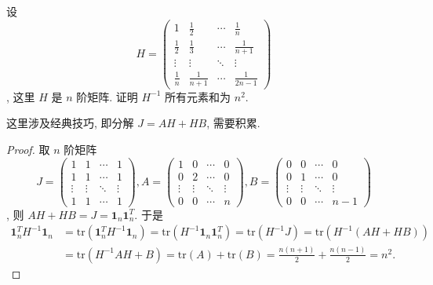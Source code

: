 \documentclass[../../main.tex]{subfiles}
\begin{document}
\begin{lemma}[Hilbert矩阵逆矩阵元素和]\label{lemma:Hilbert矩阵逆矩阵元素和}
设
\[
H = 
\begin{pmatrix}
1 & \frac{1}{2} & \cdots & \frac{1}{n} \\
\frac{1}{2} & \frac{1}{3} & \cdots & \frac{1}{n + 1} \\
\vdots & \vdots & \ddots & \vdots \\
\frac{1}{n} & \frac{1}{n + 1} & \cdots & \frac{1}{2n - 1}
\end{pmatrix}
\]
, 这里 $H$ 是 $n$ 阶矩阵. 证明 $H^{-1}$ 所有元素和为 $n^{2}$.
\end{lemma}
\begin{note}
这里涉及经典技巧, 即分解 $J = AH + HB$, 需要积累.
\end{note}
\begin{proof}
取 $n$ 阶矩阵
\[
J = 
\begin{pmatrix}
1 & 1 & \cdots & 1 \\
1 & 1 & \cdots & 1 \\
\vdots & \vdots & \ddots & \vdots \\
1 & 1 & \cdots & 1
\end{pmatrix}
,
A = 
\begin{pmatrix}
1 & 0 & \cdots & 0 \\
0 & 2 & \cdots & 0 \\
\vdots & \vdots & \ddots & \vdots \\
0 & 0 & \cdots & n
\end{pmatrix}
,
B = 
\begin{pmatrix}
0 & 0 & \cdots & 0 \\
0 & 1 & \cdots & 0 \\
\vdots & \vdots & \ddots & \vdots \\
0 & 0 & \cdots & n - 1
\end{pmatrix}
\]
,
则 $AH + HB = J = \mathbf{1}_{n}\mathbf{1}_{n}^{T}$. 于是
\begin{align*}
\mathbf{1}_{n}^{T}H^{-1}\mathbf{1}_{n} &= \mathrm{tr}\left(\mathbf{1}_{n}^{T}H^{-1}\mathbf{1}_{n}\right) = \mathrm{tr}\left(H^{-1}\mathbf{1}_{n}\mathbf{1}_{n}^{T}\right) = \mathrm{tr}\left(H^{-1}J\right) = \mathrm{tr}\left(H^{-1}(AH + HB)\right) \\
&= \mathrm{tr}\left(H^{-1}AH + B\right) = \mathrm{tr}(A) + \mathrm{tr}(B) = \frac{n(n + 1)}{2} + \frac{n(n - 1)}{2} = n^{2}.
\end{align*} 

\end{proof}
\end{document}
